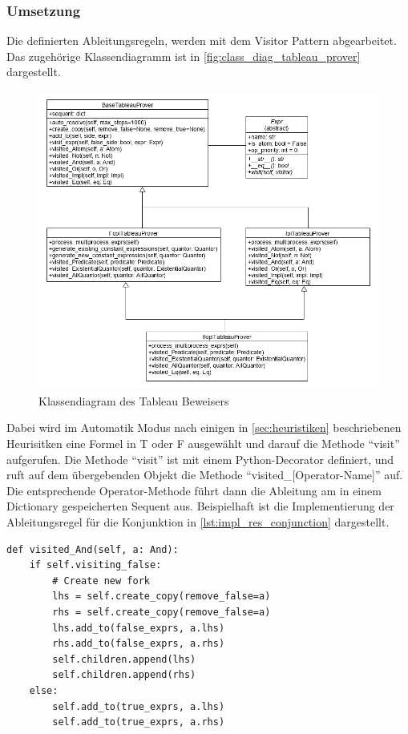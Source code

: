 \subsubsection{Umsetzung}
Die definierten Ableitungsregeln, werden mit dem Visitor Pattern abgearbeitet. \cite{gof_design_patterns} Das zugehörige Klassendiagramm ist in \autoref{fig:class_diag_tableau_prover} dargestellt.

\begin{figure}[h]
\begin{center}
\includegraphics[scale=0.55]{images/class_diag_tableau_prover.png}
\caption{Klassendiagram des Tableau Beweisers}
\label{fig:class_diag_tableau_prover}
\end{center}
\end{figure}

Dabei wird im Automatik Modus nach einigen in \autoref{sec:heuristiken} beschriebenen Heurisitken eine Formel in T oder F ausgewählt und darauf die Methode ``visit'' aufgerufen. Die Methode ``visit'' ist mit einem Python-Decorator definiert, und ruft auf dem übergebenden Objekt die Methode ``visited\_[Operator-Name]'' auf. Die entsprechende Operator-Methode führt dann die Ableitung am in einem Dictionary gespeicherten Sequent aus. Beispielhaft ist die Implementierung der Ableitungsregel für die Konjunktion in \autoref{lst:impl_res_conjunction} dargestellt.

\begin{lstlisting}[caption={Implementierung der Ableitungsregel für die Konjunktion in Aussagenlogik},label=lst:impl_res_conjunction]
def visited_And(self, a: And):
	if self.visiting_false:
		# Create new fork
		lhs = self.create_copy(remove_false=a)
		rhs = self.create_copy(remove_false=a)
		lhs.add_to(false_exprs, a.lhs)
		rhs.add_to(false_exprs, a.rhs)
		self.children.append(lhs)
		self.children.append(rhs)
	else:
		self.add_to(true_exprs, a.lhs)
		self.add_to(true_exprs, a.rhs)
\end{lstlisting}

